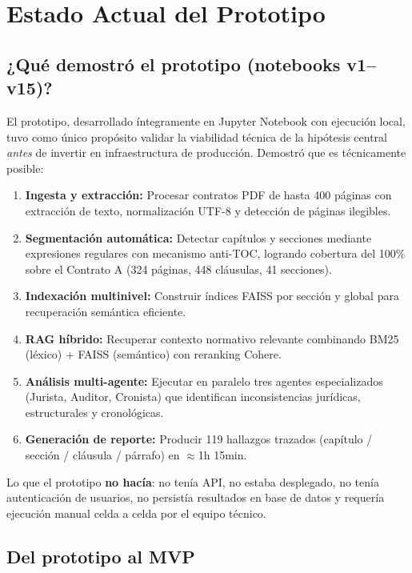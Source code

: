 \section{Estado Actual del Prototipo}

\subsection{¿Qué demostró el prototipo (notebooks v1–v15)?}

El prototipo, desarrollado íntegramente en Jupyter Notebook con ejecución local,
tuvo como único propósito validar la viabilidad técnica de la hipótesis central
\textit{antes} de invertir en infraestructura de producción. Demostró que es
técnicamente posible:

\begin{enumerate}
    \item \textbf{Ingesta y extracción:} Procesar contratos PDF de hasta
    400 páginas con extracción de texto, normalización UTF-8 y detección
    de páginas ilegibles.
    \item \textbf{Segmentación automática:} Detectar capítulos y secciones
    mediante expresiones regulares con mecanismo anti-TOC, logrando
    cobertura del 100\% sobre el Contrato A (324 páginas, 448 cláusulas, 41 secciones).
    \item \textbf{Indexación multinivel:} Construir índices FAISS por
    sección y global para recuperación semántica eficiente.
    \item \textbf{RAG híbrido:} Recuperar contexto normativo relevante
    combinando BM25 (léxico) + FAISS (semántico) con reranking Cohere.
    \item \textbf{Análisis multi-agente:} Ejecutar en paralelo tres agentes
    especializados (Jurista, Auditor, Cronista) que identifican
    inconsistencias jurídicas, estructurales y cronológicas.
    \item \textbf{Generación de reporte:} Producir 119 hallazgos trazados
    (capítulo / sección / cláusula / párrafo) en $\approx$1h 15min.
\end{enumerate}

\noindent Lo que el prototipo \textbf{no hacía}: no tenía API, no estaba
desplegado, no tenía autenticación de usuarios, no persistía resultados en
base de datos y requería ejecución manual celda a celda por el equipo técnico.

\subsection{Del prototipo al MVP}


